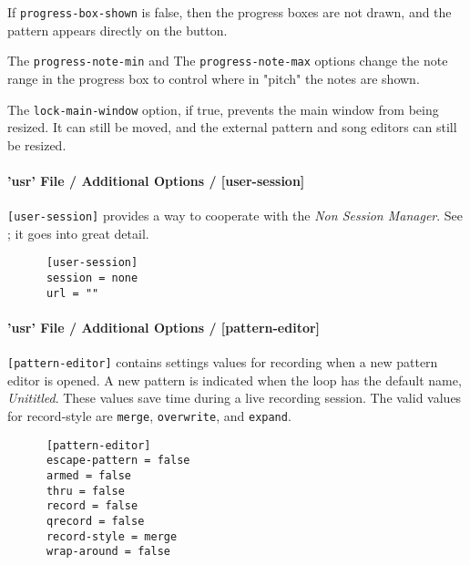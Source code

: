 
   If  \texttt{progress-box-shown} is false, then the progress boxes are not
   drawn, and the pattern appears directly on the button.

   The \texttt{progress-note-min} and
   The \texttt{progress-note-max} options change the note range in the progress
   box to control where in "pitch" the notes are shown.

   The \texttt{lock-main-window} option, if true, prevents the main window from
   being resized.  It can still be moved, and the external pattern and song
   editors can still be resized.

\paragraph{'usr' File / Additional Options / [user-session]}
\label{paragraph:user_file_added_options_session}

   \texttt{[user-session]} provides a way to cooperate with the
   \textsl{Non Session Manager}.
   See ; it goes into great
   detail.

   \begin{verbatim}
      [user-session]
      session = none
      url = ""
   \end{verbatim}

\paragraph{'usr' File / Additional Options / [pattern-editor]}
\label{paragraph:user_file_added_options_pattern_editor}

   \texttt{[pattern-editor]} contains settings values for recording
    when a new pattern editor is opened. A new pattern is indicated when
   the loop has the default name, \textsl{Unititled}.
    These values save time during a live recording session.
   The valid values for record-style are \texttt{merge},
    \texttt{overwrite}, and \texttt{expand}.

   \begin{verbatim}
      [pattern-editor]
      escape-pattern = false
      armed = false
      thru = false
      record = false
      qrecord = false
      record-style = merge
      wrap-around = false
   \end{verbatim}

